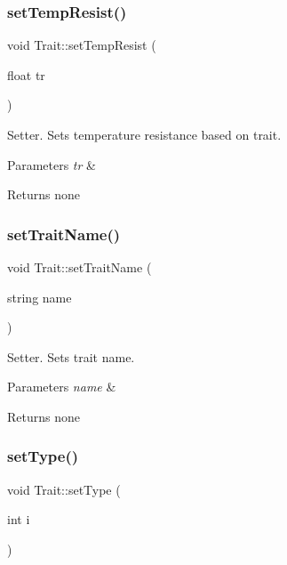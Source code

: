\subsubsection{\texorpdfstring{set\+Temp\+Resist()}{setTempResist()}}
{\footnotesize\ttfamily void Trait\+::set\+Temp\+Resist (\begin{DoxyParamCaption}\item[{float}]{tr }\end{DoxyParamCaption})}

Setter. Sets temperature resistance based on trait. 
\begin{DoxyParams}{Parameters}
{\em tr} & \\
\hline
\end{DoxyParams}
\begin{DoxyReturn}{Returns}
none 
\end{DoxyReturn}
\mbox{\label{class_trait_ac0a31db1a9d59ffbbdcb55d58aefbaea}} 
\subsubsection{\texorpdfstring{set\+Trait\+Name()}{setTraitName()}}
{\footnotesize\ttfamily void Trait\+::set\+Trait\+Name (\begin{DoxyParamCaption}\item[{string}]{name }\end{DoxyParamCaption})}

Setter. Sets trait name. 
\begin{DoxyParams}{Parameters}
{\em name} & \\
\hline
\end{DoxyParams}
\begin{DoxyReturn}{Returns}
none 
\end{DoxyReturn}
\mbox{\label{class_trait_a4409499a3a87f38106272489ecab2007}} 
\subsubsection{\texorpdfstring{set\+Type()}{setType()}}
{\footnotesize\ttfamily void Trait\+::set\+Type (\begin{DoxyParamCaption}\item[{int}]{i }\end{DoxyParamCaption})}

